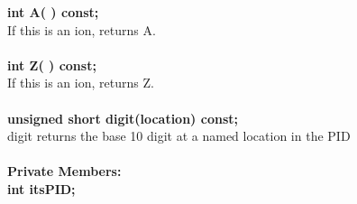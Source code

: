 \begin{tabbing}
\hspace{0.5in}  {\bf int A( ) const; }\\
\hspace{0.5in}  If this is an ion, returns A.\\ \\
\hspace{0.5in}  {\bf int Z( ) const; }\\
\hspace{0.5in}  If this is an ion, returns Z.\\ \\
\hspace{0.5in}  {\bf unsigned short digit(location) const; }\\
\hspace{0.5in}  digit returns the base 10 digit at a named location in the PID \\ \\

{\bf Private Members:} \\
\hspace{0.5in}  {\bf int itsPID; } \\

\end{tabbing}


\vfill\eject
